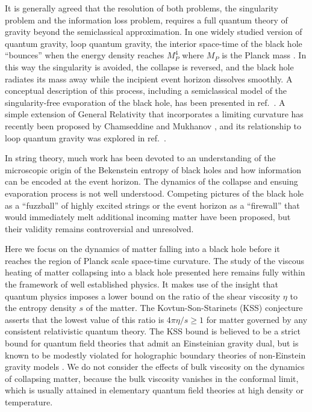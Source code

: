 \documentclass[article,twocolumn]{revtex4}
\begin{document}
It is generally agreed that the resolution of both problems, the singularity problem and the information loss problem, requires a full quantum theory of gravity beyond the semiclassical approximation. In one widely studied version of quantum gravity, loop quantum gravity, the interior space-time of the black hole ``bounces'' when the energy density reaches $M_P^4$ where $M_P$ is the Planck mass \cite{Modesto:2005zm,Modesto:2009ve}. In this way the singularity is avoided, the collapse is reversed, and the black hole radiates its mass away while the incipient event horizon dissolves smoothly. A conceptual description of this process, including a semiclassical model of the singularity-free evaporation of the black hole, has been presented in ref.~\cite{Hossenfelder:2009fc}. A simple extension of General Relativity that incorporates a limiting curvature has recently been proposed by Chamseddine and Mukhanov \cite{Chamseddine:2016uef}, and its relationship to loop quantum gravity  was explored in ref.~\cite{Bodendorfer:2017bjt}.

In string theory, much work has been devoted to an understanding of the microscopic origin of the Bekenstein entropy of black holes and how information can be encoded at the event horizon. The dynamics of the collapse and ensuing evaporation process is not well understood.  Competing pictures of the black hole as a ``fuzzball'' of highly excited strings \cite{Skenderis:2008qn} or the event horizon as a ``firewall'' \cite{Almheiri:2012rt} that would immediately melt additional incoming matter have been proposed, but their validity remains controversial and unresolved.

Here we focus on the dynamics of matter falling into a black hole before it reaches the region of Planck scale space-time curvature. The study of the viscous heating of matter collapsing into a black hole presented here remains fully within the framework of well established physics. It makes use of the insight that quantum physics imposes a lower bound on the ratio of the shear viscosity $\eta$ to the entropy density $s$ of the matter. The Kovtun-Son-Starinets (KSS) conjecture \cite{Kovtun:2004de} asserts that the lowest value of this ratio is $4\pi\eta/s \geq 1$ for matter governed by any consistent relativistic quantum theory. The  KSS bound is believed to be a strict bound for quantum field theories that admit an Einsteinian gravity dual, but is known to be modestly violated for holographic boundary theories of non-Einstein gravity models \cite{Brigante:2007nu,Brustein:2008cg}. We do not consider the effects of bulk viscosity on the dynamics of collapsing matter, because the bulk viscosity vanishes in the conformal limit, which is usually attained in elementary quantum field theories at high density or temperature.
\end{document}
